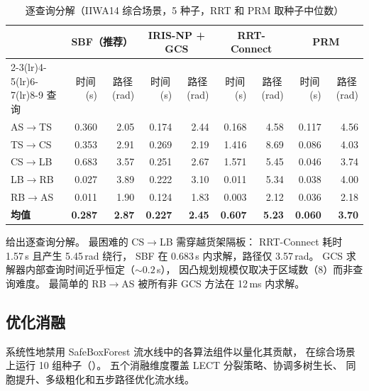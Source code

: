 \documentclass[journal]{IEEEtran}
\begin{document}



\begin{table}[t]
\centering
\caption{逐查询分解（IIWA14 综合场景，5 种子，RRT 和 PRM 取种子中位数）}
\label{tab:per_query}
\small
\begin{tabular}{@{}l rr rr rr rr@{}}
\toprule
 & \multicolumn{2}{c}{\textbf{SBF（推荐）}}
 & \multicolumn{2}{c}{\textbf{IRIS-NP + GCS}}
 & \multicolumn{2}{c}{\textbf{RRT-Connect}}
 & \multicolumn{2}{c}{\textbf{PRM}} \\
\cmidrule(lr){2-3}\cmidrule(lr){4-5}\cmidrule(lr){6-7}\cmidrule(lr){8-9}
查询 & 时间\,(s) & 路径\,(rad) & 时间\,(s) & 路径\,(rad) & 时间\,(s) & 路径\,(rad) & 时间\,(s) & 路径\,(rad) \\
\midrule
  AS$\to$TS & 0.360 & 2.05 & 0.174 & 2.44 & 0.168 & 4.58 & 0.117 & 4.56 \\
  TS$\to$CS & 0.353 & 2.91 & 0.269 & 2.19 & 1.416 & 8.69 & 0.086 & 4.03 \\
  CS$\to$LB & 0.683 & 3.57 & 0.251 & 2.67 & 1.571 & 5.45 & 0.046 & 3.74 \\
  LB$\to$RB & 0.027 & 3.89 & 0.222 & 3.10 & 0.011 & 5.34 & 0.038 & 4.00 \\
  RB$\to$AS & 0.011 & 1.90 & 0.124 & 1.83 & 0.003 & 2.12 & 0.036 & 2.18 \\
\midrule
  \textbf{均值} & \textbf{0.287} & \textbf{2.87} & \textbf{0.227} & \textbf{2.45} & \textbf{0.607} & \textbf{5.23} & \textbf{0.060} & \textbf{3.70} \\
\bottomrule
\end{tabular}
\end{table}

 给出逐查询分解。
最困难的 CS$\to$LB 需穿越货架隔板：
RRT-Connect 耗时 1.57\,s 且产生 5.45\,rad 绕行，
SBF 在 0.683\,s 内求解，路径仅 3.57\,rad。
GCS 求解器内部查询时间近乎恒定（${\sim}0.2$\,s），
因凸规划规模仅取决于区域数（8）而非查询难度。
最简单的 RB$\to$AS 被所有非 GCS 方法在 12\,ms 内求解。

\subsection{优化消融}\label{sec:exp_ablation}

系统性地禁用 SafeBoxForest 流水线中的各算法组件以量化其贡献，
在综合场景上运行 10 组种子（）。
五个消融维度覆盖 LECT 分裂策略、协调多树生长、
同胞提升、多级粗化和五步路径优化流水线。
\end{document}
